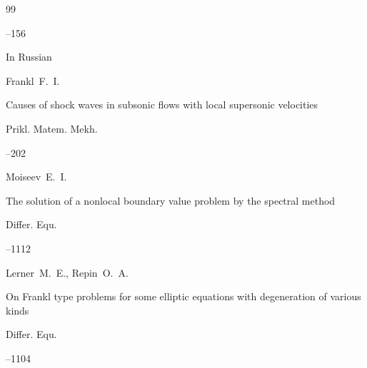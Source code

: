 \begin{thebibliography}{99}

--156








\lang In Russian

\by Frankl~F.~I.

\paper Causes of shock waves in subsonic flows with local supersonic velocities

\jour Prikl. Matem. Mekh.




--202











\by Moiseev~E.~I.

\paper The solution of a nonlocal boundary value problem by the spectral method

\jour Differ. Equ.



--1112 









\by Lerner~M.~E.,  Repin~O.~A.

\paper On Frankl type problems for some elliptic equations with degeneration of various kinds

\jour Differ. Equ.



--1104 








\end{thebibliography}
